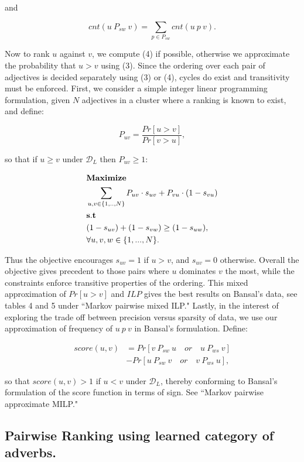 \documentclass[11pt,letterpaper]{article}
\begin{document}
and

\[
	cnt(u \: P_{sw} \: v) = \sum_{p \in P_{sw}} cnt(u \: p \: v).
\]

Now to rank $u$ against $v$, we compute (4) if possible, otherwise we approximate the probability that $u > v$ using (3). Since the ordering over each pair of adjectives is decided separately using (3) or (4), cycles do exist and transitivity must be enforced. First, we consider a simple integer linear programming formulation, given $N$ adjectives in a cluster where a ranking is known to exist, and define: 

\[
	P_{uv} = \frac{Pr[u > v]}{Pr[v > u]},
\]

so that if $u \ge v$ under $\mathcal{D}_L$ then $P_{uv} \ge 1$:

\begin{align*}
	&{\bf Maximize}\\
	&\sum_{u,v \in \{1,..,N\}} P_{uv} \cdot s_{uv} + P_{vu} \cdot (1 - s_{vu}) \\
	&{\bf s.t}\\
	&(1 - s_{uv}) + (1 - s_{vw}) \geq (1 - s_{uw}),  \\
	&\forall u,v,w \in \{1,...,N\}.\\
\end{align*}

Thus the objective encourages $s_{uv} = 1$ if $u > v$, and $s_{uv} = 0$ otherwise. Overall the objective gives precedent to those pairs where $u$ dominates $v$ the most, while the constraints enforce transitive properties of the ordering. This mixed approximation of $Pr[u > v]$ and $ILP$ gives the best results on Bansal's data, see tables 4 and 5 under ``Markov pairwise mixed ILP." Lastly, in the interest of exploring the trade off between precision versus sparsity of data, we use our approximation of frequency of $u \: p \: v$ in Bansal's formulation. Define:

\begin{align*}
  score(u,v) &= Pr[ v \: P_{sw} \: u \quad or \quad u \: P_{ws} \: v] \\
              &- Pr[ u \: P_{sw} \: v  \quad or \quad v \: P_{ws} \: u],
\end{align*}

so that $score(u,v) > 1$ if $u < v$ under $\mathcal{D}_L$, thereby conforming to Bansal's formulation of the score function in terms of sign. See ``Markov pairwise approximate MILP."

\subsection{Pairwise Ranking using learned category of adverbs.}
\end{document}
